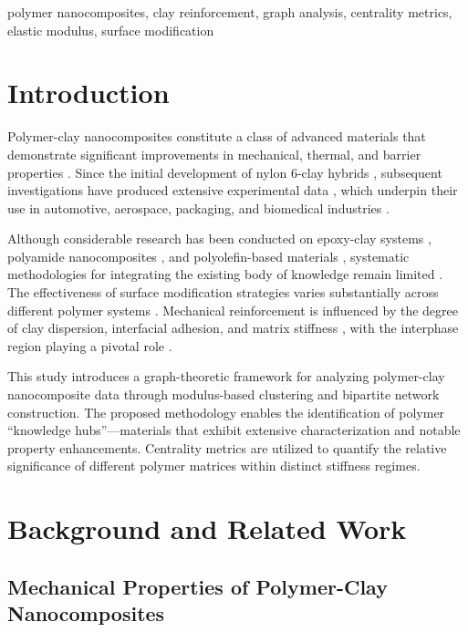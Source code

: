 \documentclass[conference]{IEEEtran}
\begin{document}
\begin{IEEEkeywords}
polymer nanocomposites, clay reinforcement, graph analysis, centrality metrics, elastic modulus, surface modification
\end{IEEEkeywords}

\section{Introduction}

Polymer-clay nanocomposites constitute a class of advanced materials that demonstrate significant improvements in mechanical, thermal, and barrier properties \cite{42, 68, 92, 112}. Since the initial development of nylon 6-clay hybrids \cite{147, 148}, subsequent investigations have produced extensive experimental data \cite{127, 140, 143}, which underpin their use in automotive, aerospace, packaging, and biomedical industries \cite{56, 67}.

Although considerable research has been conducted on epoxy-clay systems \cite{15, 24, 55, 92}, polyamide nanocomposites \cite{80, 107, 118, 124}, and polyolefin-based materials \cite{91, 125, 134, 135}, systematic methodologies for integrating the existing body of knowledge remain limited \cite{68, 91}. The effectiveness of surface modification strategies varies substantially across different polymer systems \cite{1, 69, 90, 107, 138}. Mechanical reinforcement is influenced by the degree of clay dispersion, interfacial adhesion, and matrix stiffness \cite{10, 22, 25}, with the interphase region playing a pivotal role \cite{8, 11, 13, 14, 17}.

This study introduces a graph-theoretic framework for analyzing polymer-clay nanocomposite data through modulus-based clustering and bipartite network construction. The proposed methodology enables the identification of polymer ``knowledge hubs''---materials that exhibit extensive characterization and notable property enhancements. Centrality metrics are utilized to quantify the relative significance of different polymer matrices within distinct stiffness regimes.

\section{Background and Related Work}

\subsection{Mechanical Properties of Polymer-Clay Nanocomposites}
\end{document}
